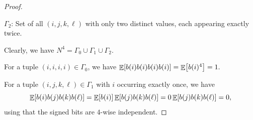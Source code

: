 \begin{proof}
\begin{compactenumi}
        \smallskip%
        \item $\Gamma_{2}$: Set of all $(i,j,k,\ell)$ with only two
        distinct values, each appearing exactly twice.
    \end{compactenumi}
    \smallskip%
    Clearly, we have $N^4 = \Gamma_0 \cup \Gamma_1 \cup \Gamma_2$.

    \smallskip

    For a tuple $(i,i,i,i) \in \Gamma_0$, we have
    \begin{math}
        \Ex{b(i) b(i) b(i) b(i)}%
        =%
        \Ex{b(i)^4}%
        =%
        1.
    \end{math}

    \smallskip

    For a tuple $(i,j,k,\ell) \in \Gamma_1$ with $i$ occurring exactly
    once, we have
    \begin{equation*}
        \Ex{b(i) b(j) b(k) b(\ell)}
        =%
        \Ex{b(i)} \Ex{ b(j) b(k) b(\ell)}
        =%
        0 \Ex{ b(j) b(k) b(\ell)}
        =%
        0,
    \end{equation*}
    using that the signed bits are $4$-wise independent.


\end{proof}
